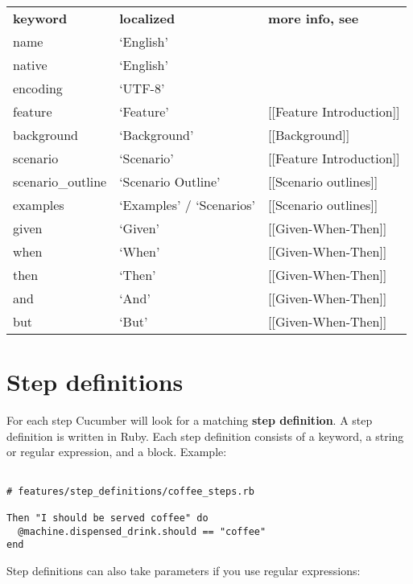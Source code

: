 \documentclass[10pt]{book}
\begin{document}
\begin{table}
  \centering
  \begin{tabular}{ l l l }
     \textbf{keyword}  &  \textbf{localized}  &  \textbf{more info, see}  \\
     name              &  `English'                 &   \\
     native            &  `English'                 &   \\
     encoding          &  `UTF-8'                   &   \\
     feature           &  `Feature'                 &  [[Feature Introduction]]  \\
     background        &  `Background'              &  [[Background]]  \\
     scenario          &  `Scenario'                &  [[Feature Introduction]]  \\
     scenario\_outline  &  `Scenario Outline'        &  [[Scenario outlines]]  \\
     examples          &  `Examples' / `Scenarios'  &  [[Scenario outlines]]   \\
     given             &  `Given'                   &  [[Given-When-Then]]  \\
     when              &  `When'                    &  [[Given-When-Then]]  \\
     then              &  `Then'                    &  [[Given-When-Then]]  \\
     and               &  `And'                     &  [[Given-When-Then]]  \\
     but               &  `But'                     &  [[Given-When-Then]]  \\
  \end{tabular}
\end{table}
\section{Step definitions}

For each step Cucumber will look for a matching \textbf{step definition}. A step definition is written in Ruby. Each step definition consists of a keyword, a string or regular expression, and a block. Example:

\begin{verbatim}

# features/step_definitions/coffee_steps.rb

Then "I should be served coffee" do
  @machine.dispensed_drink.should == "coffee"
end

\end{verbatim}
Step definitions can also take parameters if you use regular expressions:
\end{document}
